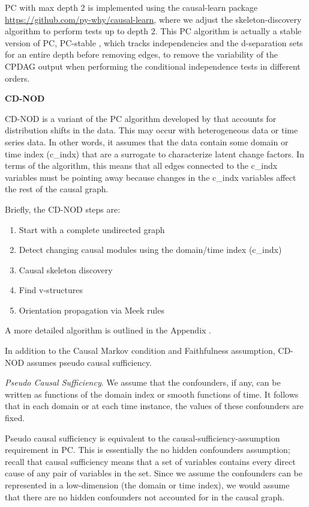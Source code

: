 \documentclass[12pt,letterpaper]{article}
\begin{document}
PC with max depth 2 is implemented using the causal-learn package  \url{https://github.com/py-why/causal-learn}, where we adjust the skeleton-discovery algorithm to perform tests up to depth 2. This PC algorithm is actually a stable version of PC, PC-stable \citep{colombo2014pcstable}, which tracks independencies and the d-separation sets for an entire depth before removing edges, to remove the variability of the CPDAG output when performing the conditional independence tests in different orders. \newline

\textbf{CD-NOD}

CD-NOD is a variant of the PC algorithm developed by \citep{huang2019cdnod} that accounts for distribution shifts in the data. This may occur with heterogeneous data or time series data. In other words, it assumes that the data contain some domain or time index (c\_indx) that are a surrogate to characterize latent change factors. In terms of the algorithm, this means that all edges connected to the c\_indx variables must be pointing away because changes in the c\_indx variables affect the rest of the causal graph. 

Briefly, the CD-NOD steps are:
\begin{enumerate}
    \item Start with a complete undirected graph
    \item Detect changing causal modules using the domain/time index (c\_indx)
    \item Causal skeleton discovery
    \item Find v-structures
    \item Orientation propagation via Meek rules
\end{enumerate}

A more detailed algorithm is outlined in the Appendix \citep{huang2019cdnod}. 

In addition to the Causal Markov condition and Faithfulness assumption, CD-NOD assumes pseudo causal sufficiency.

\textit {Pseudo Causal Sufficiency}. We assume that the confounders, if any, can be written as functions of the domain index or smooth functions of time. It follows that in each domain or at each time instance, the values of these confounders are fixed. 

Pseudo causal sufficiency is equivalent to the causal-sufficiency-assumption requirement in PC. This is essentially the no hidden confounders assumption; recall that causal sufficiency means that a set of variables contains every direct cause of any pair of variables in the set. Since we assume the confounders can be represented in a low-dimension (the domain or time index), we would assume that there are no hidden confounders not accounted for in the causal graph. 
\end{document}

